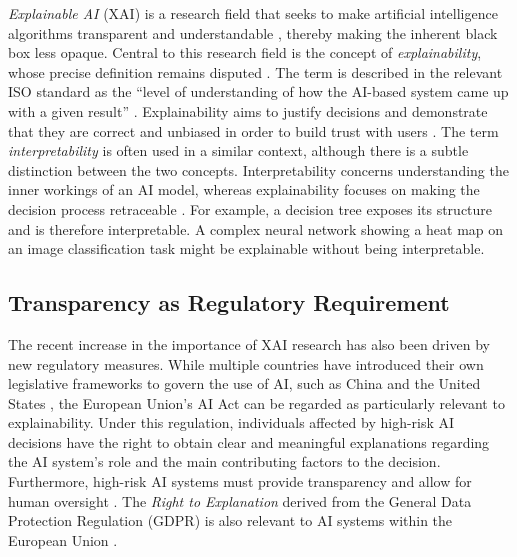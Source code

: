 \emph{Explainable AI} (XAI) is a research field that seeks to make artificial intelligence algorithms transparent and understandable \cite{hsiehComprehensiveGuideExplainable2024}, thereby making the inherent black box less opaque. Central to this research field is the concept of \emph{explainability}, whose precise definition remains disputed \cite{roscherExplainableMachineLearning2020}. The term is described in the relevant ISO standard as the \enquote{level of understanding of how the AI-based system came up with a given result} \cite{ISOIECTR}. Explainability aims to justify decisions and demonstrate that they are correct and unbiased in order to build trust with users \cite{aliExplainableArtificialIntelligence2023}. The term \emph{interpretability} is often used in a similar context, although there is a subtle distinction between the two concepts. Interpretability concerns understanding the inner workings of an AI model, whereas explainability focuses on making the decision process retraceable \cite{garouaniInvestigatingDualityInterpretability2024, aliExplainableArtificialIntelligence2023}. For example, a decision tree exposes its structure and is therefore interpretable. A complex neural network showing a heat map on an image classification task might be explainable without being interpretable.
\subsection{Transparency as Regulatory Requirement}
\label{sec:transparency_as_regulatory_requirement}
The recent increase in the importance of XAI research has also been driven by new regulatory measures. While multiple countries have introduced their own legislative frameworks to govern the use of AI, such as China \cite{zouNavigatingChinasRegulatory2025} and the United States \cite{BlueprintAIBill}, the European Union's AI Act \cite{RegulationEU20242024} can be regarded as particularly relevant to explainability. Under this regulation, individuals affected by high-risk AI decisions have the right to obtain clear and meaningful explanations regarding the AI system’s role and the main contributing factors to the decision. Furthermore, high-risk AI systems must provide transparency and allow for human oversight \cite{RegulationEU20242024}. The \emph{Right to Explanation} derived from the General Data Protection Regulation (GDPR) is also relevant to AI systems within the European Union \cite{nisevicExplainableAICan2024}.

